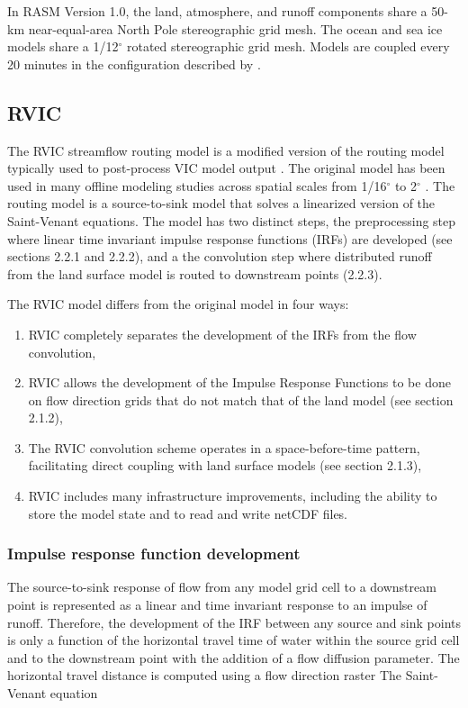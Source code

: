 \documentclass[ms, draft]{agutex}
\begin{document}
\begin{article}
In RASM Version 1.0, the land, atmosphere, and runoff components share a 50-km near-equal-area North Pole stereographic grid mesh.
The ocean and sea ice models share a 1/12$^{\circ}$ rotated stereographic grid mesh.
Models are coupled every 20 minutes in the configuration described by \citet{Roberts_2015a}.

\subsection{RVIC}

The RVIC streamflow routing model is a modified version of the routing model typically used to post-process VIC model output \cite{Lohmann_1996, Lohmann_1998a}.
The original \citet{Lohmann_1996} model has been used in many offline modeling studies across spatial scales from 1/16$^{\circ}$ to 2$^{\circ}$ \citep[.e.g.][]{Nijssen_1997,Lohmann_1998b,Su_2005}.
The routing model is a source-to-sink model that solves a linearized version of the Saint-Venant equations.
The model has two distinct steps, the preprocessing step where linear time invariant impulse response functions (IRFs) are developed (see sections 2.2.1 and 2.2.2), and a the convolution step where distributed runoff from the land surface model is routed to downstream points (2.2.3).

The RVIC model differs from the original \citet{Lohmann_1996} model in four ways:

\begin{enumerate}
\item RVIC completely separates the development of the IRFs from the flow convolution,
\item RVIC allows the development of the Impulse Response Functions to be done on flow direction grids that do not match that of the land model (see section 2.1.2),
\item The RVIC convolution scheme operates in a space-before-time pattern, facilitating direct coupling with land surface models (see section 2.1.3),
\item RVIC includes many infrastructure improvements, including the ability to store the model state and to read and write netCDF files.
\end{enumerate}

\subsubsection{Impulse response function development}

The source-to-sink response of flow from any model grid cell to a downstream point is represented as a linear and time invariant response to an impulse of runoff.
Therefore, the development of the IRF between any source and sink points is only a function of the horizontal travel time of water within the source grid cell and to the downstream point with the addition of a flow diffusion parameter.
The horizontal travel distance is computed using a flow direction raster \citep[e.g.][]{Wu_2011}
The Saint-Venant equation


\end{article}
\end{document}
